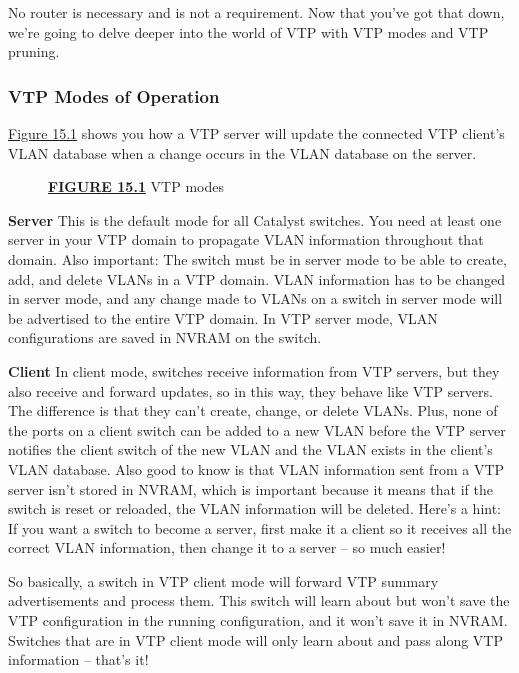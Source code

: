 No router is necessary and is not a requirement. Now that you've got
that down, we're going to delve deeper into the world of VTP with VTP
modes and VTP pruning.

\subsubsection[VTP Modes of
Operation]{\texorpdfstring{\protect\hypertarget{c15.xhtmlux5cux23c15-sec-5}{}{}VTP
Modes of Operation}{VTP Modes of Operation}}

\protect\hyperlink{c15.xhtmlux5cux23figure15-1}{Figure 15.1} shows you
how a VTP server will update the connected VTP client's VLAN database
when a change occurs in the VLAN database on the server.

\begin{figure}
\centering
\caption{{\protect\hyperlink{c15.xhtmlux5cux23figureanchor15-1}{\textbf{FIGURE
15.1}} VTP modes}}
\end{figure}

\textbf{Server} This
is the default mode for all Catalyst switches. You need at least one
server in your VTP domain to propagate VLAN information throughout that
domain. Also important: The switch must be in server mode to be able to
create, add, and delete VLANs in a VTP domain. VLAN information has to
be changed in server mode, and any change made to VLANs on a switch in
server mode will be advertised to the entire VTP domain. In VTP server
mode, VLAN configurations are saved in NVRAM on the switch.

\textbf{Client} In client mode, switches receive information from VTP
servers, but they also receive and forward updates, so in this way, they
behave like VTP servers. The difference is that they can't create,
change, or delete VLANs. Plus, none of the ports on a client switch can
be added to a new VLAN before the VTP server notifies the client switch
of the new VLAN and the VLAN exists in the client's VLAN database. Also
good to know is that VLAN information sent from a VTP server isn't
stored in NVRAM, which is important because it means that if the switch
is reset or reloaded, the VLAN information will be deleted. Here's a
hint: If you want a switch to become a server, first make it a client so
it receives all the correct VLAN information, then change it to a
server -- so much easier!

So basically, a switch in VTP client mode will forward VTP summary
advertisements and process them. This switch will learn about but won't
save the VTP configuration in the running configuration, and it won't
save it in NVRAM. Switches that are in VTP client mode will only learn
about and pass along VTP information -- that's it!


